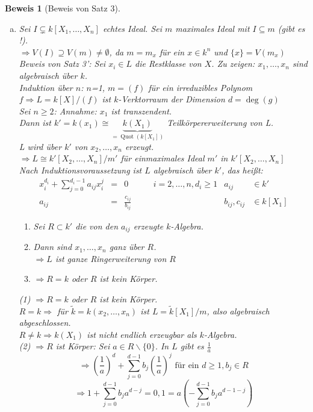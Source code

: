 \documentclass[a4paper,12pt]{report}
\theoremstyle{break}
\theoremstyle{nonumberbreak}
\newtheorem{Bew}{Beweis}
\theoremstyle{nonumberplain}
\DeclareMathOperator{\Quot}{Quot}
\begin{document}
\begin{Bew}[Beweis von Satz 3]\begin{enumerate}[a)]
\item
Sei $I\subsetneq k[X_1,\dots ,X_n]$ echtes Ideal. Sei $m$ maximales Ideal mit $I\subseteq m$ (gibt es !).\\
$\Rightarrow V(I) \supseteq V(m) \neq \emptyset$, da $m=m_x$ f\"ur ein $x\in k^n$ und $\{x\}=V(m_x)$\\
\emph{Beweis von Satz 3':} Sei $x_i\in L$ die Restklasse von $X$. \emph{Zu zeigen:} $x_1,\dots ,x_n$ sind algebraisch \"uber $k$.\\
\emph{Induktion \"uber $n$:} $n$=1, $m=(f)$ f\"ur ein irreduzibles Polynom $f \Rightarrow L=k[X]/(f)$ ist $k$-Verktorraum der Dimension $d= \deg(g)$\\
Sei $n\geq 2$: \emph{Annahme:} $x_1$ ist transzendent.\\
Dann ist $k'=k(x_1) \cong \underbrace{k(X_1)}_{=\Quot{(k[X_1])}}$ Teilk\"orpererweiterung von L.\\
L wird \"uber $k'$ von $x_2,\dots ,x_n$ erzeugt.\\
$\Rightarrow L \cong k'[X_2,\dots ,X_n]/m'$ f\"ur einmaximales Ideal $m'$ in $k'[X_2,\dots ,X_n]$\\
Nach Induktionsvoraussetzung ist $L$ algebraisch \"uber $k'$, das hei\ss t:
	\[\begin{array}{rclccrl}
	x_i^{d_i} + \sum_{j=0}^{d_i-1} a_{ij}x_i^j &=& 0 & \quad & i=2,\dots ,n, d_i \geq1 & a_{ij} &\in k'\\
	a_{ij} &=& \frac{c_{ij}}{b_{ij}} & \quad & & b_{ij}, c_{ij} &\in k[X_1]
	\end{array}\]
\begin{enumerate}[(1)]
\item Sei $R\subset k'$ die von den $a_{ij}$ erzeugte $k$-Algebra.
\item Dann sind $x_1,\dots ,x_n$ ganz \"uber $R$.\\
	$\Rightarrow L$ ist ganze Ringerweiterung von $R$
\item $\Rightarrow R=k$ oder $R$ ist kein K\"orper.
\end{enumerate}
(1) $\Rightarrow R=k$ oder $R$ ist kein K\"orper.\\
$R=k \Rightarrow $ f\"ur $\tilde k=k(x_2,\dots ,x_n)$ ist $L= \tilde k[X_1]/m$, also algebraisch abgeschlossen.\\
$R\neq k \Rightarrow k(X_1)$ ist nicht endlich erzeugbar als $k$-Algebra.\\
(2) $\Rightarrow R$ ist K\"orper: Sei $a\in R\backslash\{0\}$. In $L$ gibt es $\frac{1}{a}$
	\[\Rightarrow \left(\frac{1}{a}\right)^d+\sum_{j=0}^{d-1} b_j\left(\frac{1}{a} \right)^j\textrm{ f\"ur ein } d\geq1, b_j\in R\]
	\[\Rightarrow 1+\sum_{j=0}^{d-1} b_ja^{d-j} = 0, 1 = a\left( -\sum_{j=0}^{d-1}b_ja^{d-1-j} \right)\]


\end{enumerate}
\end{Bew}
\end{document}
